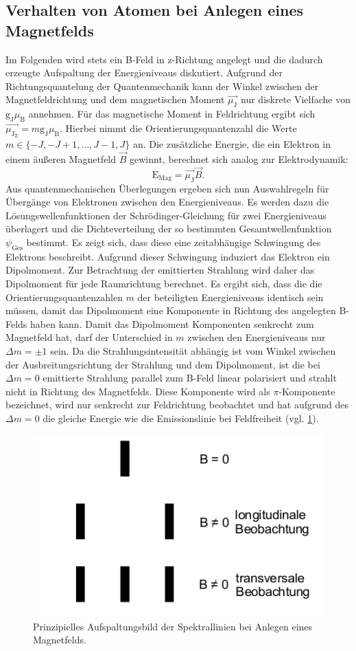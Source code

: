 \subsection{Verhalten von Atomen bei Anlegen eines Magnetfelds}
Im Folgenden wird stets ein B-Feld in z-Richtung angelegt und die dadurch erzeugte Aufspaltung der Energieniveaus diskutiert.
Aufgrund der Richtungsquantelung der Quantenmechanik kann der Winkel zwischen der Magnetfeldrichtung und dem magnetischen Moment $\vec{\mu_{\mathrm{J}}}$ nur diskrete Vielfache von $\mathrm{g_J}\mu_{\mathrm{B}}$ annehmen. Für das magnetische Moment in Feldrichtung ergibt sich $\vec{\mu_{\mathrm{J_Z}}}=m\mathrm{g_J}\mu_{\mathrm{B}}$. Hierbei nimmt die Orientierungsquantenzahl die Werte $m \in \{-J, -J + 1, ...,J-1, J\}$ an.
Die zusätzliche Energie, die ein Elektron in einem äußeren Magnetfeld $\vec{B}$ gewinnt, berechnet sich analog zur Elektrodynamik:
\begin{equation}
  \label{eqn:Emag}
  \mathrm{E_{Mag}}=\vec{\mu_{\mathrm{J}}}\vec{B}\mathrm{.}
\end{equation}
Aus quantenmechanischen Überlegungen ergeben sich nun Auswahlregeln für Übergänge von Elektronen zwischen den Energieniveaus.
Es werden dazu die Lösungswellenfunktionen der Schrödinger-Gleichung für zwei Energieniveaus überlagert und die Dichteverteilung der so bestimmten Gesamtwellenfunktion $\psi_{\mathrm{Ges}}$ bestimmt. Es zeigt sich, dass diese eine zeitabhängige Schwingung des Elektrons beschreibt.
Aufgrund dieser Schwingung induziert das Elektron ein Dipolmoment. Zur Betrachtung der emittierten Strahlung wird daher das Dipolmoment für jede Raumrichtung berechnet.
Es ergibt sich, dass die die Orientierungsquantenzahlen $m$ der beteiligten Energieniveaus identisch sein müssen, damit das Dipolmoment eine Komponente in Richtung des angelegten B-Felds haben kann. Damit das Dipolmoment Komponenten senkrecht zum Magnetfeld hat, darf der Unterschied in $m$ zwischen den Energieniveaus nur $\Delta m=\pm 1$ sein.
Da die Strahlungsintensität abhängig ist vom Winkel zwischen der Ausbreitungsrichtung der Strahlung und dem Dipolmoment, ist die bei $\Delta m=0$ emittierte Strahlung parallel zum B-Feld linear polarisiert und strahlt nicht in Richtung des Magnetfelds.
Diese Komponente wird als $\pi$-Komponente bezeichnet, wird nur senkrecht zur Feldrichtung beobachtet und hat aufgrund des $\Delta m=0$ die gleiche Energie wie die Emissionslinie bei Feldfreiheit (vgl. \ref{fig:linien}).
\begin{figure}
  \centering
  \includegraphics[width=0.7\columnwidth]{pictures/linien.png}
  \caption{Prinzipielles Aufspaltungsbild der Spektrallinien bei Anlegen eines Magnetfelds.\cite{Anleitung}}
  \label{fig:linien}
\end{figure}
